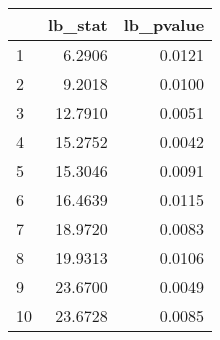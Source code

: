 \begin{tabular}{lrr}
\toprule
{} &  lb\_stat &  lb\_pvalue \\
\midrule
1  &   6.2906 &     0.0121 \\
2  &   9.2018 &     0.0100 \\
3  &  12.7910 &     0.0051 \\
4  &  15.2752 &     0.0042 \\
5  &  15.3046 &     0.0091 \\
6  &  16.4639 &     0.0115 \\
7  &  18.9720 &     0.0083 \\
8  &  19.9313 &     0.0106 \\
9  &  23.6700 &     0.0049 \\
10 &  23.6728 &     0.0085 \\
\bottomrule
\end{tabular}
